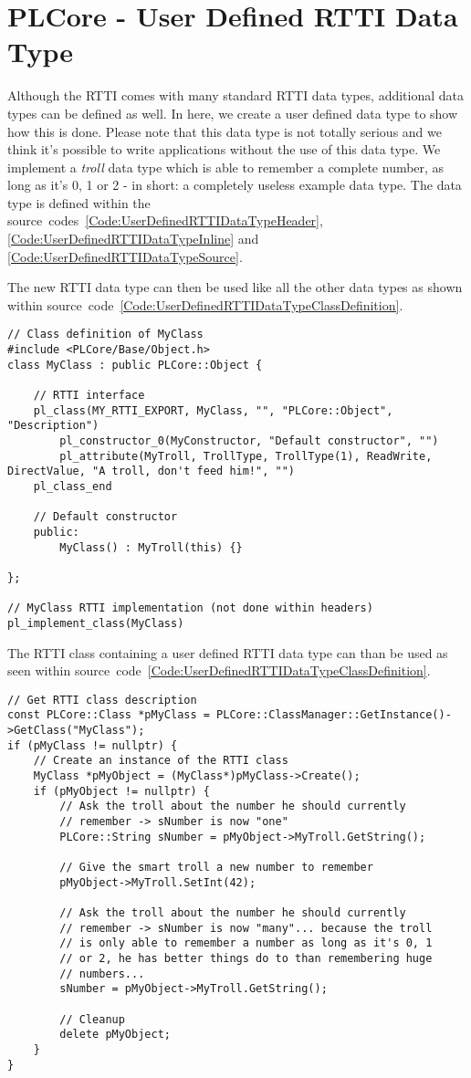 \chapter{PLCore - User Defined RTTI Data Type}
\label{Appendix:UserDefinedRTTIDataType}
Although the RTTI comes with many standard RTTI data types, additional data types can be defined as well. In here, we create a user defined data type to show how this is done. Please note that this data type is not totally serious and we think it's possible to write applications without the use of this data type. We implement a \emph{troll} data type which is able to remember a complete number, as long as it's 0, 1 or 2 - in short: a completely useless example data type. The data type is defined within the source~codes~\ref{Code:UserDefinedRTTIDataTypeHeader}, \ref{Code:UserDefinedRTTIDataTypeInline} and \ref{Code:UserDefinedRTTIDataTypeSource}.

The new RTTI data type can then be used like all the other data types as shown within source~code~\ref{Code:UserDefinedRTTIDataTypeClassDefinition}.
\begin{lstlisting}[label=Code:UserDefinedRTTIDataTypeClassDefinition,caption={RTTI class using a user defined RTTI data type}]
// Class definition of MyClass
#include <PLCore/Base/Object.h>
class MyClass : public PLCore::Object {

	// RTTI interface
	pl_class(MY_RTTI_EXPORT, MyClass, "", "PLCore::Object", "Description")
		pl_constructor_0(MyConstructor, "Default constructor", "")
		pl_attribute(MyTroll, TrollType, TrollType(1), ReadWrite, DirectValue, "A troll, don't feed him!", "")
	pl_class_end

	// Default constructor
	public:
		MyClass() : MyTroll(this) {}

};

// MyClass RTTI implementation (not done within headers)
pl_implement_class(MyClass)
\end{lstlisting}
The RTTI class containing a user defined RTTI data type can than be used as seen within source~code~\ref{Code:UserDefinedRTTIDataTypeClassDefinition}.
\begin{lstlisting}[label=Code:UserDefinedRTTIDataTypeClassUsage,caption={Using a RTTI class containing a user defined RTTI data type}]
// Get RTTI class description
const PLCore::Class *pMyClass = PLCore::ClassManager::GetInstance()->GetClass("MyClass");
if (pMyClass != nullptr) {
	// Create an instance of the RTTI class
	MyClass *pMyObject = (MyClass*)pMyClass->Create();
	if (pMyObject != nullptr) {
		// Ask the troll about the number he should currently
		// remember -> sNumber is now "one"
		PLCore::String sNumber = pMyObject->MyTroll.GetString();

		// Give the smart troll a new number to remember
		pMyObject->MyTroll.SetInt(42);

		// Ask the troll about the number he should currently
		// remember -> sNumber is now "many"... because the troll
		// is only able to remember a number as long as it's 0, 1
		// or 2, he has better things do to than remembering huge
		// numbers...
		sNumber = pMyObject->MyTroll.GetString();

		// Cleanup
		delete pMyObject;
	}
}
\end{lstlisting}


